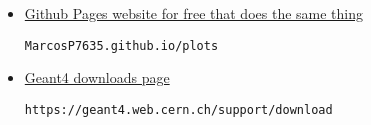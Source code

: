 \documentclass[12pt]{article}
\begin{document}
\begin{itemize}
\item \href{https://MarcosP7635.github.io/plots}{Github Pages website for free that does the same thing}
\begin{lstlisting}[breaklines]
MarcosP7635.github.io/plots
\end{lstlisting}

\item \href{https://geant4.web.cern.ch/support/download}{Geant4 downloads page}
\begin{lstlisting}[breaklines]
https://geant4.web.cern.ch/support/download
\end{lstlisting}

\end{itemize}
\end{document}
